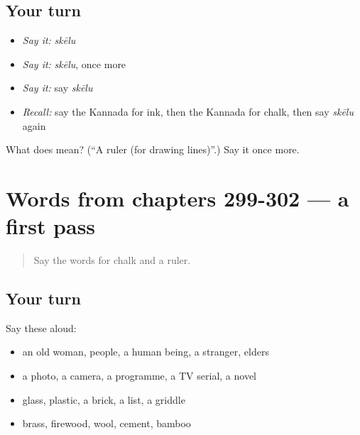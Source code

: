 \subsection*{Your turn}
\begin{itemize}
\raggedright
  \item \emph{Say it:} \emph{skēlu}
  \item \emph{Say it:} \emph{skēlu}, once more
  \item \emph{Say it:} say \emph{skēlu}
  \item \emph{Recall:} say the Kannada for ink, then the Kannada for chalk, then say \emph{skēlu} again
\end{itemize}

\begin{tcolorbox}[breakable,colback=teal!4,colframe=teal!35!black,title={Before you move on}]
What does  mean? (\textquotedblleft{}A ruler (for drawing lines)\textquotedblright{}.) Say it once more.
\end{tcolorbox}
\section[(dialogue)]{Words from chapters 299-302 — a first pass}

\label{lesson:KA-R307-first-pass-words-from-chapters-299-302}



\begin{quote}
Say the words for chalk and a ruler.
\end{quote}

\subsection*{Your turn}
Say these aloud:

\begin{itemize}
\raggedright
  \item an old woman, people, a human being, a stranger, elders
  \item a photo, a camera, a programme, a TV serial, a novel
  \item glass, plastic, a brick, a list, a griddle
  \item brass, firewood, wool, cement, bamboo
\end{itemize}

